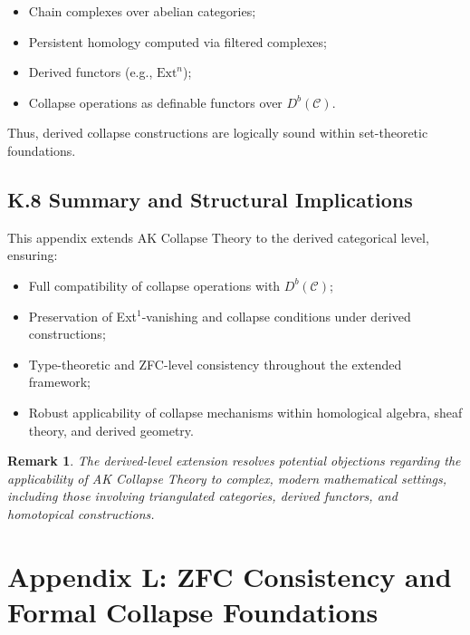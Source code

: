 \documentclass[11pt]{article}
\newtheorem{remark}[theorem]{Remark}
\begin{document}
\begin{itemize}
    \item Chain complexes over abelian categories;
    \item Persistent homology computed via filtered complexes;
    \item Derived functors (e.g., \( \mathrm{Ext}^n \));
    \item Collapse operations as definable functors over \( D^b(\mathcal{C}) \).
\end{itemize}

Thus, derived collapse constructions are logically sound within set-theoretic foundations.

\subsection*{K.8 Summary and Structural Implications}

This appendix extends AK Collapse Theory to the derived categorical level, ensuring:

\begin{itemize}
    \item Full compatibility of collapse operations with \( D^b(\mathcal{C}) \);
    \item Preservation of Ext$^1$-vanishing and collapse conditions under derived constructions;
    \item Type-theoretic and ZFC-level consistency throughout the extended framework;
    \item Robust applicability of collapse mechanisms within homological algebra, sheaf theory, and derived geometry.
\end{itemize}

\begin{remark}
The derived-level extension resolves potential objections regarding the applicability of AK Collapse Theory to complex, modern mathematical settings, including those involving triangulated categories, derived functors, and homotopical constructions.
\end{remark}



\section*{Appendix L: ZFC Consistency and Formal Collapse Foundations}
\end{document}
